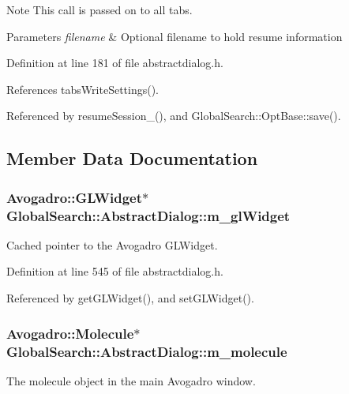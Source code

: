 \begin{DoxyNote}{Note}
This call is passed on to all tabs. 
\end{DoxyNote}

\begin{DoxyParams}{Parameters}
{\em filename} & Optional filename to hold resume information \\
\hline
\end{DoxyParams}


Definition at line 181 of file abstractdialog.\-h.



References tabs\-Write\-Settings().



Referenced by resume\-Session\-\_\-(), and Global\-Search\-::\-Opt\-Base\-::save().



\subsection{Member Data Documentation}
\hypertarget{classGlobalSearch_1_1AbstractDialog_a18c6963416c0b49012fa94fd451c96d9}{
\subsubsection[{m\-\_\-gl\-Widget}]{\setlength{\rightskip}{0pt plus 5cm}Avogadro\-::\-G\-L\-Widget$\ast$ Global\-Search\-::\-Abstract\-Dialog\-::m\-\_\-gl\-Widget\hspace{0.3cm}{\ttfamily [protected]}}}\label{classGlobalSearch_1_1AbstractDialog_a18c6963416c0b49012fa94fd451c96d9}
Cached pointer to the Avogadro G\-L\-Widget. 

Definition at line 545 of file abstractdialog.\-h.



Referenced by get\-G\-L\-Widget(), and set\-G\-L\-Widget().

\hypertarget{classGlobalSearch_1_1AbstractDialog_a9cf65fe592eebca0ec72a5597edc7faf}{
\subsubsection[{m\-\_\-molecule}]{\setlength{\rightskip}{0pt plus 5cm}Avogadro\-::\-Molecule$\ast$ Global\-Search\-::\-Abstract\-Dialog\-::m\-\_\-molecule\hspace{0.3cm}{\ttfamily [protected]}}}\label{classGlobalSearch_1_1AbstractDialog_a9cf65fe592eebca0ec72a5597edc7faf}
The molecule object in the main Avogadro window. 

